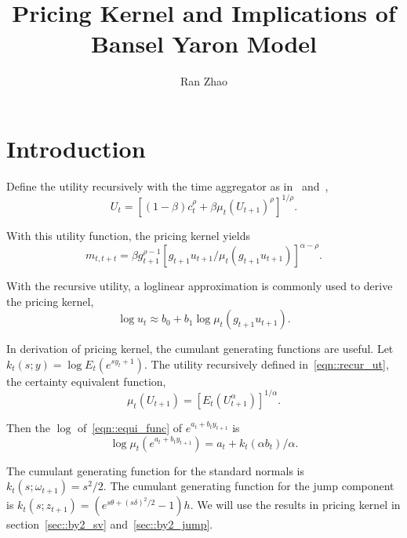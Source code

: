 \documentclass[11pt,reqno,final]{amsart}
\title{Pricing Kernel and Implications of Bansel Yaron Model}
\author{Ran Zhao}
\begin{document}
\begin{abstract}

\end{abstract}

\maketitle
%
%
%
\section{Introduction}
Define the utility recursively with the time aggregator as in~\cite{EZ89}
and~\cite{W89},
\begin{equation} \label{eqn::recur_ut}
U_t = \left[ (1-\beta)c_t^{\rho} +\beta\mu_t(U_{t+1})^{\rho} \right]^{1/\rho}.
\end{equation}

With this utility function, the pricing kernel yields
\begin{equation} \label{eqn::pricing_kernel}
m_{t,t+t} = \beta g_{t+1}^{\rho-1} \left[ g_{t+1}u_{t+1}/\mu_t(g_{t+1}u_{t+1}) \right]^{\alpha-\rho}.
\end{equation}

With the recursive utility, a loglinear approximation is commonly used to derive the pricing kernel,
\begin{equation} \label{eqn::loglinear}
\log u_{t} \approx b_0 + b_1 \log \mu_t(g_{t+1}u_{t+1}).
\end{equation}

In derivation of pricing kernel, the cumulant generating functions are useful. Let $k_t(s;y)=\log E_t(e^{sy_t+1})$. The utility recursively defined in~\ref{eqn::recur_ut}, the certainty equivalent function,
\begin{equation} \label{eqn::equi_func}
\mu_t(U_{t+1}) = [E_t(U_{t+1}^{\alpha})]^{1/\alpha}.
\end{equation}

Then the $\log$ of~\ref{eqn::equi_func} of $e^{a_t+b_t y_{t+1}}$ is
$$
\log \mu_t(e^{a_t+b_t y_{t+1}}) = a_t + k_t (\alpha b_t) / \alpha.
$$

The cumulant generating function for the standard normals is $k_t(s;\omega_{t+1})=s^2/2$. The cumulant generating function for the jump component is $k_t(s;z_{t+1})=(e^{s\theta+(s\delta)^2/2}-1)h$. We will use the results in pricing kernel in section~\ref{sec::by2_sv} and~\ref{sec::by2_jump}.
\end{document}
